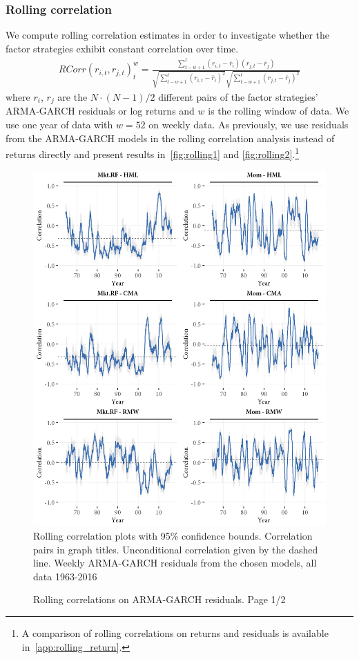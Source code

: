 \subsubsection{Rolling correlation}
\label{subsubsec:roll_corr}
We compute rolling correlation estimates in order to investigate whether the factor strategies exhibit constant correlation over time. 
\begin{align}
    RCorr(r_{i, t}, r_{j, t})_t^{w} = \frac{\sum^{t}_{t-w+1}(r_{i, t} - \bar{r}_i)(r_{j,t} - \bar{r}_j)}{\sqrt{\sum^{t}_{t-w+1} (r_{i,t} - \bar{r}_i)^2} \sqrt{\sum^{t}_{t-w+1} (r_{j,t} - \bar{r}_j)^2}}
\end{align}
where $r_i$, $r_j$ are the $N \cdot (N-1) / 2$ different pairs of the factor strategies' ARMA-GARCH residuals or log returns and $w$ is the rolling window of data. We use one year of data with $w = 52$ on weekly data. As previously, we use residuals from the ARMA-GARCH models in the rolling correlation analysis instead of returns directly and present results in~\autoref{fig:rolling1} and \autoref{fig:rolling2}.\footnote{A comparison of rolling correlations on returns and residuals is available in~\autoref{app:rolling_return}.}
\begin{figure}[htbp]
  \caption{Rolling correlations on ARMA-GARCH residuals. Page 1/2}
  \label{fig:rolling1}
  \centering
  \begin{minipage}{\textwidth}
  \includegraphics[scale=1]{graphics/rolling1.png}  
  \vspace{3mm}
  \footnotesize
  Rolling correlation plots with 95\% confidence bounds. Correlation pairs in graph titles. Unconditional correlation given by the dashed line. Weekly ARMA-GARCH residuals from the chosen models, all data 1963-2016
  \end{minipage}
\end{figure}
